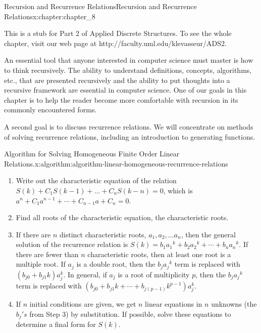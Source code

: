 \documentclass[oneside,10pt,]{book}
\numberwithin{equation}{section}
\begin{document}
%
%
\typeout{************************************************}
\typeout{************************************************}
%
\begin{chapterptx}{Recursion and Recurrence Relations}{}{Recursion and Recurrence Relations}{}{}{x:chapter:chapter_8}
\begin{introduction}{}%
This is a stub for Part 2 of Applied Discrete Structures. To see the whole chapter, visit our web page at http:\slash{}\slash{}faculty.uml.edu\slash{}klevasseur\slash{}ADS2.%
\par
An essential tool that anyone interested in computer science must master is how to think recursively. The ability to understand definitions, concepts, algorithms, etc., that are presented recursively and the ability to put thoughts into a recursive framework are essential in computer science. One of our goals in this chapter is to help the reader become more comfortable with recursion in its commonly encountered forms.%
\par
A second goal is to discuss recurrence relations. We will concentrate on methods of solving recurrence relations, including an introduction to generating functions.%
\end{introduction}%
\begin{algorithm}{Algorithm for Solving Homogeneous Finite Order Linear Relations.}{}{x:algorithm:algorithm-linear-homogeneous-recurrence-relations}%
%
\begin{enumerate}[label=(\alph*)]
\item{}Write out the characteristic equation of the relation \(S(k) + C_1S(k - 1) +\ldots + C_n S(k - n) =0\), which is \(a^n+ C_1a^{n-1}+\cdots
+C_{n-1}a+C_n=0\).%
\item{}Find all roots of the characteristic equation, the characteristic roots.%
\item{}If there are \(n\) distinct characteristic roots, \(a_1, a_2, \dots a_n\), then the general solution of the recurrence relation is \(S(k) = b_1a_1{}^k+ b_2a_2{}^k+\cdots +b_na_n{}^k\). If there are fewer than \(n\) characteristic roots, then at least one root is a multiple root. If \(a_j\) is a double root, then the \(b_ja_j{}^k\) term is replaced with \(\left(b_{j 0}+b_{j 1}k\right)a_j^{k}\textrm{.}\) In general, if \(a_j\) is a root of multiplicity \(p\), then the \(b_ja_j{}^k\) term is replaced with \(\left(b_{j 0}+b_{j 1}k+\cdots +b_{j(p-1)}k^{p-1}\right)a_j^{k}\).%
\item{}If \(n\) initial conditions are given, we get \(n\) linear equations in \(n\) unknowns (the \({b_j}'s\) from Step 3) by substitution. If possible, solve these equations to determine a final form for \(S(k)\).%

\end{enumerate}
\end{algorithm}
\end{chapterptx}
\end{document}
